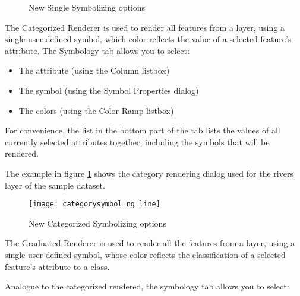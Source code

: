 \begin{figure}[ht]
\centering
   \hspace{1cm}
   \hspace{1cm}
\caption{New Single Symbolizing options \nixcaption}
\end{figure}


The Categorized Renderer is used to render all features from a layer, using a 
single user-defined symbol, which color reflects the value of a selected 
feature's attribute. The Symbology tab allows you to select:

\begin{itemize}[label=--]
\item The attribute (using the Column listbox)
\item The symbol (using the Symbol Properties dialog)
\item The colors (using the Color Ramp listbox)  
\end{itemize}

For convenience, the list in the bottom part of the tab lists the values of 
all currently selected attributes together, including the symbols that will 
be rendered.

The example in figure \ref{fig:catsymNG} shows the category rendering dialog 
used for the rivers layer of the \qg sample dataset.

\begin{figure}[ht]
   \centering
   \caption{New Categorized Symbolizing options \nixcaption}\label{fig:catsymNG}
   \texttt{[image: categorysymbol\_ng\_line]}
\end{figure}


The Graduated Renderer is used to render all the features from a layer, using 
a single user-defined symbol, whose color reflects the classification of a selected 
feature's attribute to a class.

Analogue to the categorized rendered, the symbology tab allows you to select:

